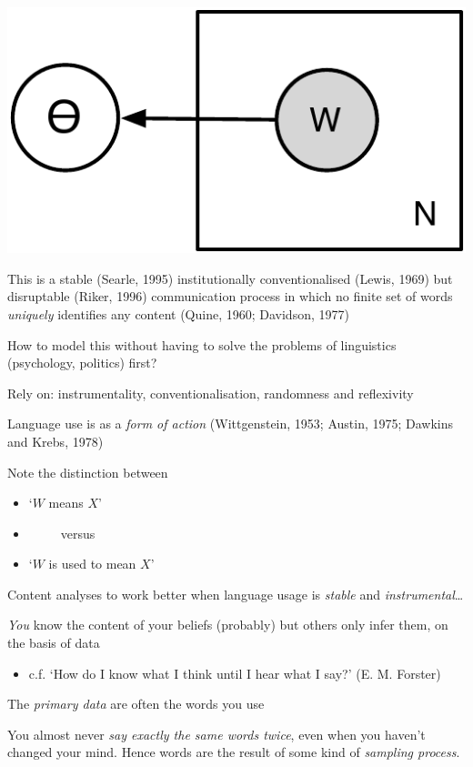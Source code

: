\documentclass[11pt,compress,professionalfonts]{beamer}
\newcommand{\ita}{\begin{itemize}}
\newcommand{\itm}{\item[]}
\newcommand{\itz}{\end{itemize}}
\begin{document}
\begin{center}
\includegraphics[scale=.9]{pictures/inf-plate}
\end{center}




This is a stable (Searle, 1995) institutionally conventionalised (Lewis, 1969) but disruptable (Riker, 1996) communication process
in which no finite set of words \textsl{uniquely} identifies any content (Quine, 1960; Davidson, 1977)

How to model this without having to solve the problems of linguistics (psychology, politics) first?

Rely on: instrumentality, conventionalisation, randomness and reflexivity


Language use is as a \textit{form of action} (Wittgenstein, 1953; Austin, 1975; Dawkins and Krebs, 1978)

Note the distinction between
\ita
\itm `$W$ {means} $X$'
\itm ~~~~~versus 
\itm `$W$ {is used to mean} $X$' 
\itz

Content analyses to work better when language usage is \textit{stable} and \textit{instrumental}\ldots




\textit{You} know the content of your beliefs (probably) 
but others only infer them, on the basis of data
\ita
\itm c.f. `How do I know what I think until I hear what I say?' (E. M. Forster)
\itz
The \textsl{primary data} are often the words you use 

You almost never \textit{say exactly the same words twice}, even when you haven't changed your mind.  Hence words are the result of some kind of \textsl{sampling process}.  
 
\end{document}
